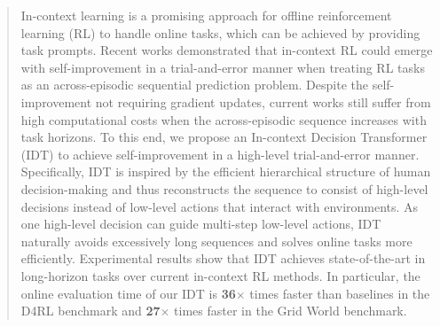 \documentclass{article}
\theoremstyle{plain}
\theoremstyle{definition}
\theoremstyle{remark}
\begin{document}
\printAffiliationsAndNotice{\icmlEqualContribution}
\begin{abstract}
In-context learning is a promising approach for offline reinforcement learning (RL) to handle online tasks, which can be achieved by providing task prompts. Recent works demonstrated that in-context RL could emerge with self-improvement in a trial-and-error manner when treating RL tasks as an across-episodic sequential prediction problem. Despite the self-improvement not requiring gradient updates, current works still suffer from high computational costs when the across-episodic sequence increases with task horizons. To this end, we propose an In-context Decision Transformer (IDT) to achieve self-improvement in a high-level trial-and-error manner. Specifically, IDT is inspired by the efficient hierarchical structure of human decision-making and thus reconstructs the sequence to consist of high-level decisions instead of low-level actions that interact with environments. As one high-level decision can guide multi-step low-level actions, IDT naturally avoids excessively long sequences and solves online tasks more efficiently. Experimental results show that IDT achieves state-of-the-art in long-horizon tasks over current in-context RL methods. In particular, the online evaluation time of our IDT is \textbf{36$\bm\times$} times faster than baselines in the D4RL benchmark and \textbf{27$\bm\times$} times faster in the Grid World benchmark.
\end{abstract}
\end{document}
